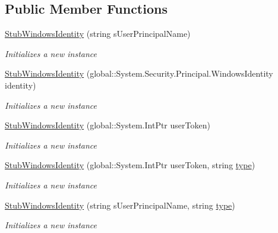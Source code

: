 \subsection*{Public Member Functions}
\begin{DoxyCompactItemize}
\item 
\hyperlink{class_system_1_1_security_1_1_principal_1_1_fakes_1_1_stub_windows_identity_a5e7a674b2b7fb22b0cb00fa1cf3f6952}{Stub\-Windows\-Identity} (string s\-User\-Principal\-Name)
\begin{DoxyCompactList}\small\item\em Initializes a new instance\end{DoxyCompactList}\item 
\hyperlink{class_system_1_1_security_1_1_principal_1_1_fakes_1_1_stub_windows_identity_a61d3ea5a060fe41f0a06daf38238a04b}{Stub\-Windows\-Identity} (global\-::\-System.\-Security.\-Principal.\-Windows\-Identity identity)
\begin{DoxyCompactList}\small\item\em Initializes a new instance\end{DoxyCompactList}\item 
\hyperlink{class_system_1_1_security_1_1_principal_1_1_fakes_1_1_stub_windows_identity_a0cb8bada5ae8b1afb0d6676104eb88cb}{Stub\-Windows\-Identity} (global\-::\-System.\-Int\-Ptr user\-Token)
\begin{DoxyCompactList}\small\item\em Initializes a new instance\end{DoxyCompactList}\item 
\hyperlink{class_system_1_1_security_1_1_principal_1_1_fakes_1_1_stub_windows_identity_a36dae4f8e6ad296c7c03692142bd2d1a}{Stub\-Windows\-Identity} (global\-::\-System.\-Int\-Ptr user\-Token, string \hyperlink{jquery-1_810_82-vsdoc_8js_a3940565e83a9bfd10d95ffd27536da91}{type})
\begin{DoxyCompactList}\small\item\em Initializes a new instance\end{DoxyCompactList}\item 
\hyperlink{class_system_1_1_security_1_1_principal_1_1_fakes_1_1_stub_windows_identity_a0ae2ea689e66a3fbd403c076f51f6ecc}{Stub\-Windows\-Identity} (string s\-User\-Principal\-Name, string \hyperlink{jquery-1_810_82-vsdoc_8js_a3940565e83a9bfd10d95ffd27536da91}{type})
\begin{DoxyCompactList}\small\item\em Initializes a new instance\end{DoxyCompactList}\item 

\end{DoxyCompactItemize}
